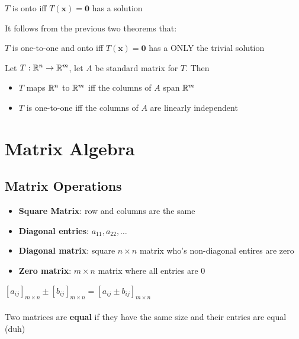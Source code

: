 \documentclass{report}
\begin{document}
\begin{theorem}
    $T$ is onto iff $T(\mathbf{x}) = \mathbf{0}$ has a solution
\end{theorem}

It follows from the previous two theorems that:

\begin{theorem}
    $T$ is one-to-one and onto iff $T(\mathbf{x}) = \mathbf{0}$ has a ONLY the trivial solution
\end{theorem}

\begin{theorem}
    Let $T: \mathbb{R}^n \to \mathbb{R}^m$, let $A$ be standard matrix for $T$. Then
    \begin{itemize}
        \item $T$ maps $\mathbb{R}^n$ to $\mathbb{R}^m$ iff the columns of $A$ span $\mathbb{R}^m$
        \item $T$ is one-to-one iff the columns of $A$ are linearly independent
    \end{itemize}
\end{theorem}

\chapter{Matrix Algebra}

\section{Matrix Operations}
\begin{itemize}
    \item \textbf{Square Matrix}: row and columns are the same
    \item \textbf{Diagonal entries}: $a_{11}, a_{22}, \ldots$
    \item \textbf{Diagonal matrix}: square $n \times n$ matrix who's non-diagonal entires are zero
    \item \textbf{Zero matrix}: $m \times n$ matrix where all entries are 0
\end{itemize}

$\left[ a_{ij} \right]_{m \times n} \pm \left[ b_{ij} \right]_{m \times n} = \left[ a_{ij} \pm b_{ij} \right]_{m \times n}$
\\\\
Two matrices are \textbf{equal} if they have the same size and their entries are equal (duh)
\end{document}
